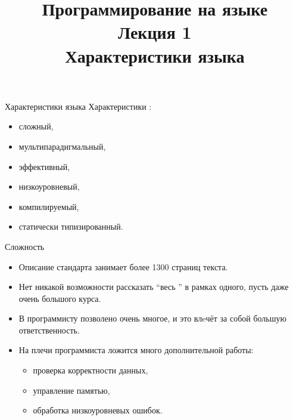 \documentclass[aspectration=1610]{beamer}
\title{{\bf Программирование на языке \langcpp\protect\\Лекция
1\protect\vspace{1em}\\}Характеристики языка \langcpp}
\begin{document}
\begin{frame} 
  \titlepage
\end{frame}

\begin{frame}{Характеристики языка \langcpp}
    Характеристики \langcpp:
    \begin{itemize}
        \item сложный,
        \item мультипарадигмальный,
        \item эффективный,
        \item низкоуровневый,
        \item компилируемый,
        \item статически типизированный.
    \end{itemize}
\end{frame}

\begin{frame}[fragile]{Сложность}
    \begin{itemize}
        \item 
            Описание стандарта занимает более 1300 страниц текста.

        \item  Нет никакой возможности рассказать ``весь \langcpp'' в рамках
            одного, пусть даже очень большого курса.

        \item В \langcpp программисту позволено очень многое, и это влeчёт за
            собой большую ответственность.

        \item На плечи программиста ложится много дополнительной
            работы:
            \begin{itemize}
                \item проверка корректности данных, 
                \item управление памятью, 
                \item обработка низкоуровневых ошибок.
            \end{itemize}
    \end{itemize}
\end{frame}
\end{document}

